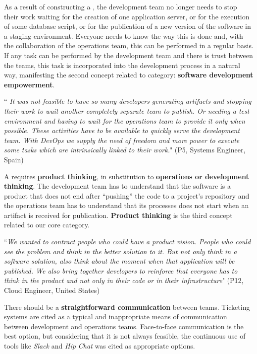 As a result of constructing a \cc, the development
team no longer needs to stop their work waiting for the creation
of one application server, or for the execution of some database script, or for
the publication of a new version of the software in a staging environment.
Everyone needs to know the way this is done and, with the collaboration of the
operations team, this can be performed in a regular basis. If any task can be
performed by the development team and there is trust between the teams, this task is
incorporated into the development process in a natural way, manifesting the
second concept related to \cc category: \textbf{software
development empowerment}.

\begin{mq}
``\emph{
It was not feasible to have so many developers generating artifacts and
stopping their work to wait another completely separate team to publish. Or
needing a test environment and having to wait for the operations team to
provide it only when possible. These activities have to be available to quickly
serve the development team. With DevOps we supply the need of freedom and
more power to execute some tasks which are intrinsically linked to their work.}"
(P5, Systems Engineer, Spain)
\end{mq}

A \cc requires  \textbf{product thinking}, in substitution to
\textbf{operations or development thinking}. The development team has to understand that
the software is a product that does not end after ``pushing'' the code to a
project's repository and the operations team has to understand that its processes does not
start when an artifact is received for publication. \textbf{Product thinking}
is the third concept related to our core category.

\begin{mq}
``\emph{We wanted to
contract people who could have a product vision. People who could see the
problem and think in the better solution to it. But not only think in a
software solution, also think about the moment when that application will be
published. We also bring together developers to reinforce that everyone
has to think in the product and not only in
their code or in their infrastructure}" (P12, Cloud Engineer, United States)
\end{mq}

There should be a \textbf{straightforward communication} between teams. Ticketing
systems are cited as a typical and inappropriate means of communication
between development and operations teams. Face-to-face communication is the best
option, but considering that it is not always feasible, the continuous use of
tools like \emph{Slack} and \emph{Hip Chat} was cited as appropriate options.

